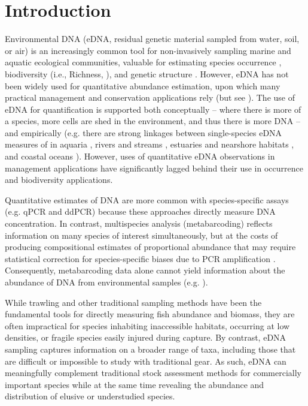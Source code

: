 \documentclass{article}
\begin{document}
\section*{Introduction}
Environmental DNA (eDNA, residual genetic material sampled from water, soil, or air) is an increasingly common tool for non-invasively sampling marine and aquatic ecological communities, valuable for estimating species occurrence \cite{veilleux2021}, biodiversity (i.e., Richness, \cite{muenzel2024}), and genetic structure \cite{andres2023a}. However, eDNA has not been widely used for quantitative abundance estimation, upon which many practical management and conservation applications rely (but see \cite{shelton2022,guri2024a,stoeckle2022a}). The use of eDNA for quantification is supported both conceptually -- where there is more of a species, more cells are shed in the environment, and thus there is more DNA -- and empirically (e.g. there are strong linkages between single-species eDNA measures of in aquaria \cite{jo2019b,ledger2024}, rivers and streams \cite{pont2024}, estuaries and nearshore habitats \cite{dibattista2022, baetscher2024}, and coastal oceans \cite{maes2023, shelton2019}). However, uses of quantitative eDNA observations in management applications have significantly lagged behind their use in occurrence and biodiversity applications. 

Quantitative estimates of DNA are more common with species-specific assays (e.g. qPCR and ddPCR) because these approaches directly measure DNA concentration. In contrast, multispecies analysis (metabarcoding) reflects information on many species of interest simultaneously, but at the costs of producing compositional estimates of proportional abundance \cite{gloor2017a, mclaren2019} that may require statistical correction for species-specific biases due to PCR amplification \cite{shelton2023}. Consequently, metabarcoding data alone cannot yield information about the abundance of DNA from environmental samples (e.g. \cite{guri2024a}).

While trawling and other traditional sampling methods have been the fundamental tools for directly measuring fish abundance and biomass, they are often impractical for species inhabiting inaccessible habitats, occurring at low densities, or fragile species easily injured during capture. By contrast, eDNA sampling captures information on a broader range of taxa, including those that are difficult or impossible to study with traditional gear. As such, eDNA can meaningfully complement traditional stock assessment methods for commercially important species while at the same time revealing the abundance and distribution of elusive or understudied species.
\end{document}
